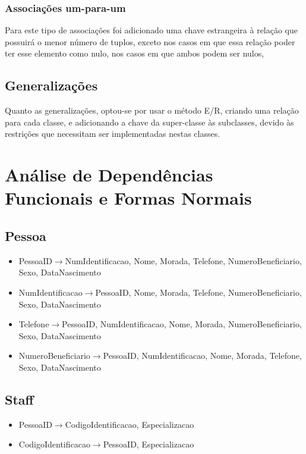 \documentclass[article, a4paper, 12pt, oneside]{memoir}
\begin{document}
\subsection{Associações um-para-um}
Para este tipo de associações foi adicionado uma chave estrangeira à relação que possuirá o menor número de tuplos, exceto nos casos em que essa relação poder ter esse elemento como nulo, nos casos em que ambos podem ser nulos, 

\section{Generalizações}
Quanto as generalizações, optou-se por usar o método E/R, criando uma relação para cada classe, e adicionando a chave da super-classe às subclasses, devido às restrições que necessitam ser implementadas nestas classes.

\newpage
\chapter[Análise de DFs e FNs][Análise de FDs e FNs]{Análise de Dependências Funcionais e Formas Normais} \label{\thechapter}

\section*{Pessoa}
\begin{itemize}
	\item PessoaID$\rightarrow$NumIdentificacao, Nome, Morada, Telefone, NumeroBeneficiario, Sexo, DataNascimento
	\item NumIdentificacao$\rightarrow$PessoaID, Nome, Morada, Telefone, NumeroBeneficiario, Sexo, DataNascimento
	\item Telefone$\rightarrow$PessoaID, NumIdentificacao, Nome, Morada, NumeroBeneficiario, Sexo, DataNascimento
	\item NumeroBeneficiario$\rightarrow$PessoaID, NumIdentificacao, Nome, Morada, Telefone, Sexo, DataNascimento
\end{itemize}

\section*{Staff}
\begin{itemize}
	\item PessoaID$\rightarrow$CodigoIdentificacao, Especializacao
	\item CodigoIdentificacao$\rightarrow$PessoaID, Especializacao
\end{itemize}
\end{document}
